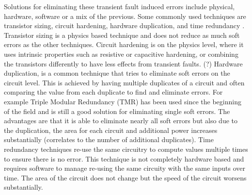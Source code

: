 \documentclass[12pt]{report}
\begin{document}
Solutions for eliminating these transient fault induced errors include physical, hardware, software or a mix of the previous.  Some commonly used techniques are transistor sizing, circuit hardening, hardware duplication, and time redundancy \cite{Mitra_08_softerrors}.  Transistor sizing is a physics based technique and does not reduce as much soft errors as the other techniques.  Circuit hardening is on the physics level, where it uses intrinsic properties such as resistive or capacitive hardening, or combining the transistors differently to have less effects from transient faults. (?)  Hardware duplication, is a common technique that tries to eliminate soft errors on the circuit level.  This is achieved by having multiple duplicates of a circuit and often comparing the value from each duplicate to find and eliminate errors.  For example Triple Modular Redundancy (TMR) has been used since the beginning of the field and is still a good solution for eliminating single soft errors.  The advantages are that it is able to eliminate nearly all soft errors but also due to the duplication, the area for each circuit and additional power increases substantially (correlates to the number of additional duplicates).  Time redundancy techniques re-use the same circuitry to compute values multiple times to ensure there is no error.  This technique is not completely hardware based and requires software to manage re-using the same circuity with the same inputs over time.  The area of the circuit does not change but the speed of the circuit worsens substantially. \\
\end{document}
